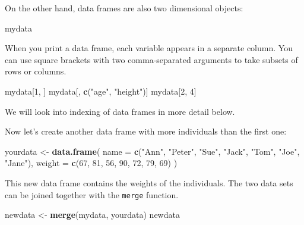 \documentclass[
]{book}
\newenvironment{Shaded}{\begin{snugshade}}{\end{snugshade}}
\newcommand{\AttributeTok}[1]{\textcolor[rgb]{0.13,0.29,0.53}{#1}}
\newcommand{\DecValTok}[1]{\textcolor[rgb]{0.00,0.00,0.81}{#1}}
\newcommand{\FunctionTok}[1]{\textcolor[rgb]{0.13,0.29,0.53}{\textbf{#1}}}
\newcommand{\NormalTok}[1]{#1}
\newcommand{\OtherTok}[1]{\textcolor[rgb]{0.56,0.35,0.01}{#1}}
\newcommand{\StringTok}[1]{\textcolor[rgb]{0.31,0.60,0.02}{#1}}
\begin{document}
On the other hand, data frames are also two dimensional objects:

\begin{Shaded}
\begin{Highlighting}[]
\NormalTok{mydata}
\end{Highlighting}
\end{Shaded}

When you print a data frame, each variable appears in a separate
column. You can use square brackets with two comma-separated
arguments to take subsets of rows or columns.

\begin{Shaded}
\begin{Highlighting}[]
\NormalTok{mydata[}\DecValTok{1}\NormalTok{, ]}
\NormalTok{mydata[, }\FunctionTok{c}\NormalTok{(}\StringTok{"age"}\NormalTok{, }\StringTok{"height"}\NormalTok{)]}
\NormalTok{mydata[}\DecValTok{2}\NormalTok{, }\DecValTok{4}\NormalTok{]}
\end{Highlighting}
\end{Shaded}

We will look into indexing of data frames in more detail below.

Now let's create another data frame with more individuals than the
first one:

\begin{Shaded}
\begin{Highlighting}[]
\NormalTok{yourdata }\OtherTok{\textless{}{-}} \FunctionTok{data.frame}\NormalTok{(}
  \AttributeTok{name =} \FunctionTok{c}\NormalTok{(}\StringTok{"Ann"}\NormalTok{, }\StringTok{"Peter"}\NormalTok{, }\StringTok{"Sue"}\NormalTok{, }\StringTok{"Jack"}\NormalTok{, }\StringTok{"Tom"}\NormalTok{, }\StringTok{"Joe"}\NormalTok{, }\StringTok{"Jane"}\NormalTok{),}
  \AttributeTok{weight =} \FunctionTok{c}\NormalTok{(}\DecValTok{67}\NormalTok{, }\DecValTok{81}\NormalTok{, }\DecValTok{56}\NormalTok{, }\DecValTok{90}\NormalTok{, }\DecValTok{72}\NormalTok{, }\DecValTok{79}\NormalTok{, }\DecValTok{69}\NormalTok{)}
\NormalTok{)}
\end{Highlighting}
\end{Shaded}

This new data frame contains the weights of the individuals. The two
data sets can be joined together with the \texttt{merge} function.

\begin{Shaded}
\begin{Highlighting}[]
\NormalTok{newdata }\OtherTok{\textless{}{-}} \FunctionTok{merge}\NormalTok{(mydata, yourdata)}
\NormalTok{newdata}
\end{Highlighting}
\end{Shaded}
\end{document}
